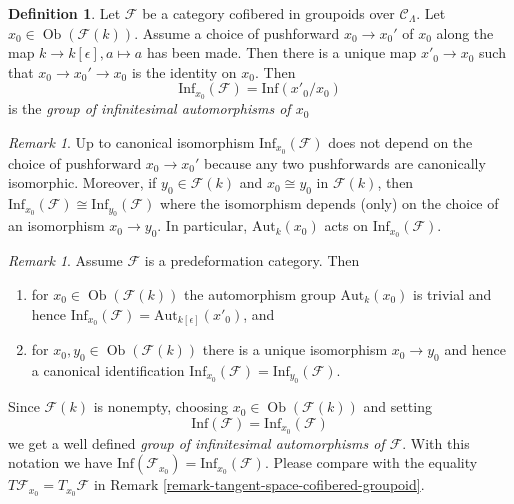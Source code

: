 \documentclass{stacks-project}
\theoremstyle{plain}
\theoremstyle{definition}
\newtheorem{definition}[subsection]{Definition}
\theoremstyle{remark}
\newtheorem{remark}[subsection]{Remark}
\numberwithin{equation}{subsection}
\def\Ob{\mathop{\mathrm{Ob}}\nolimits}
\begin{document}
\begin{definition}
\label{definition-infinitesimal-auts}
Let $\mathcal{F}$ be a category cofibered in groupoids over $\mathcal
C_\Lambda$. Let $x_0 \in \Ob(\mathcal{F}(k))$. Assume a choice of
pushforward $x_0 \to x_0'$ of $x_0$ along the map
$k \to k[\epsilon], a \mapsto a$ has been made.
Then there is a unique map $x'_0 \to x_0$ such that
$x_0 \to x_0' \to x_0$ is the identity on $x_0$.
Then
$$
\text{Inf}_{x_0}(\mathcal F) = \text{Inf}(x'_0/x_0)
$$
is the {\it group of infinitesimal automorphisms of $x_0$}
\end{definition}

\begin{remark}
\label{remark-choice-pushforward-immaterial-infinitesimal-aut}
Up to canonical isomorphism $\text{Inf}_{x_0}(\mathcal{F})$
does not depend on the choice of pushforward $x_0 \to x_0'$
because any two pushforwards are canonically isomorphic.
Moreover, if $y_0 \in \mathcal{F}(k)$ and $x_0 \cong y_0$ in
$\mathcal{F}(k)$, then
$\text{Inf}_{x_0}(\mathcal{F}) \cong \text{Inf}_{y_0}(\mathcal{F})$
where the isomorphism depends (only) on the choice of an isomorphism
$x_0 \to y_0$. In particular, $\text{Aut}_k(x_0)$
acts on $\text{Inf}_{x_0}(\mathcal{F})$.
\end{remark}

\begin{remark}
\label{remark-trivial-aut-point}
Assume $\mathcal{F}$ is a predeformation category. Then
\begin{enumerate}
\item for $x_0 \in \Ob(\mathcal{F}(k))$ the automorphism group
$\text{Aut}_k(x_0)$ is trivial and hence
$\text{Inf}_{x_0}(\mathcal{F}) = \text{Aut}_{k[\epsilon]}(x'_0)$, and
\item for $x_0, y_0 \in \Ob(\mathcal{F}(k))$ there is a unique
isomorphism $x_0 \to y_0$ and hence a canonical identification
$\text{Inf}_{x_0}(\mathcal{F}) = \text{Inf}_{y_0}(\mathcal{F})$.
\end{enumerate}
Since $\mathcal{F}(k)$ is nonempty, choosing $x_0 \in \Ob(\mathcal{F}(k))$
and setting
$$
\text{Inf}(\mathcal{F}) = \text{Inf}_{x_0}(\mathcal{F})
$$
we get a well defined {\it group of infinitesimal automorphisms
of $\mathcal{F}$}. With this notation we have
$\text{Inf}(\mathcal{F}_{x_0}) = \text{Inf}_{x_0}(\mathcal{F})$.
Please compare with the equality
$T\mathcal{F}_{x_0} = T_{x_0}\mathcal{F}$
in Remark \ref{remark-tangent-space-cofibered-groupoid}.
\end{remark}
\end{document}
